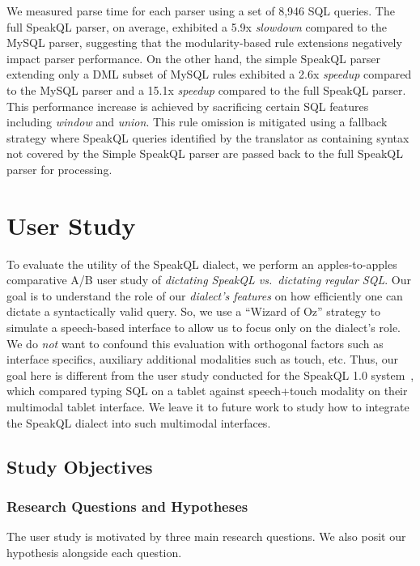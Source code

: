 We measured parse time for each parser using a set of 8,946 SQL queries. The full SpeakQL parser, on average, exhibited a 5.9x \emph{slowdown} compared to the MySQL parser, suggesting that the modularity-based rule extensions negatively impact parser performance. On the other hand, the simple SpeakQL parser extending only a DML subset of MySQL rules exhibited a 2.6x \emph{speedup} compared to the MySQL parser and a 15.1x \emph{speedup} compared to the full SpeakQL parser. This performance increase is achieved by sacrificing certain SQL features including \emph{window} and \emph{union}. This rule omission is mitigated using a fallback strategy where SpeakQL queries identified by the translator as containing syntax not covered by the Simple SpeakQL parser are passed back to the full SpeakQL parser for processing.



\section{User Study}


To evaluate the utility of the SpeakQL dialect, we perform an apples-to-apples comparative A/B user study of \textit{dictating SpeakQL vs.~dictating regular SQL}. 
Our goal is to understand the role of our \emph{dialect's features} on how efficiently one can dictate a syntactically valid query. 
So, we use a ``Wizard of Oz'' strategy to simulate a speech-based interface to allow us to focus only on the dialect's role. 
We do \textit{not} want to confound this evaluation with orthogonal factors such as interface specifics, auxiliary additional modalities such as touch, etc. 
Thus, our goal here is different from the user study conducted for the SpeakQL 1.0 system~\cite{Shah2020}, 
which compared typing SQL on a tablet against speech+touch modality on their multimodal tablet interface. 
We leave it to future work to study how to integrate the SpeakQL dialect into such multimodal interfaces. 


\subsection{Study Objectives}

\subsubsection{\textbf{Research Questions and Hypotheses}}

The user study is motivated by three main research questions. We also posit our hypothesis alongside each question.

